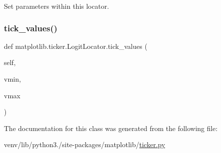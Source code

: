 \begin{DoxyVerb}Set parameters within this locator.\end{DoxyVerb}
 \mbox{\label{classmatplotlib_1_1ticker_1_1LogitLocator_a23b468d98b7e6b2e281363576bf8896d}} 
\subsubsection{\texorpdfstring{tick\+\_\+values()}{tick\_values()}}
{\footnotesize\ttfamily def matplotlib.\+ticker.\+Logit\+Locator.\+tick\+\_\+values (\begin{DoxyParamCaption}\item[{}]{self,  }\item[{}]{vmin,  }\item[{}]{vmax }\end{DoxyParamCaption})}



The documentation for this class was generated from the following file\+:\begin{DoxyCompactItemize}
\item 
venv/lib/python3./site-\/packages/matplotlib/\hyperlink{ticker_8py}{ticker.\+py}\end{DoxyCompactItemize}
